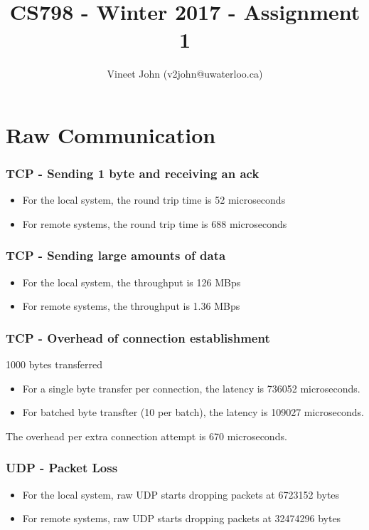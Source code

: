 \documentclass[a4paper]{article}
\title{CS798 - Winter 2017 - Assignment 1}
\author{Vineet John (v2john@uwaterloo.ca)}
\date{}
\begin{document}
\maketitle

\listoftodos

\part{Raw Communication}

\section{TCP - Sending 1 byte and receiving an ack}
\begin{itemize}
	\item For the local system, the round trip time is 52 microseconds
	\item For remote systems, the round trip time is 688 microseconds
\end{itemize}

\section{TCP - Sending large amounts of data}
\begin{itemize}
	\item For the local system, the throughput is 126 MBps
	\item For remote systems, the throughput is 1.36 MBps
\end{itemize}


\section{TCP - Overhead of connection establishment}
1000 bytes transferred
\begin{itemize}
	\item For a single byte transfer per connection, the latency is 736052 microseconds.
	\item For batched byte transfter (10 per batch), the latency is 109027 microseconds.
\end{itemize}

The overhead per extra connection attempt is 670 microseconds.

\section{UDP - Packet Loss} \label{udp_packet_loss}
\begin{itemize}
	\item For the local system, raw UDP starts dropping packets at 6723152 bytes
	\item For remote systems, raw UDP starts dropping packets at 32474296 bytes
\end{itemize}
\end{document}
